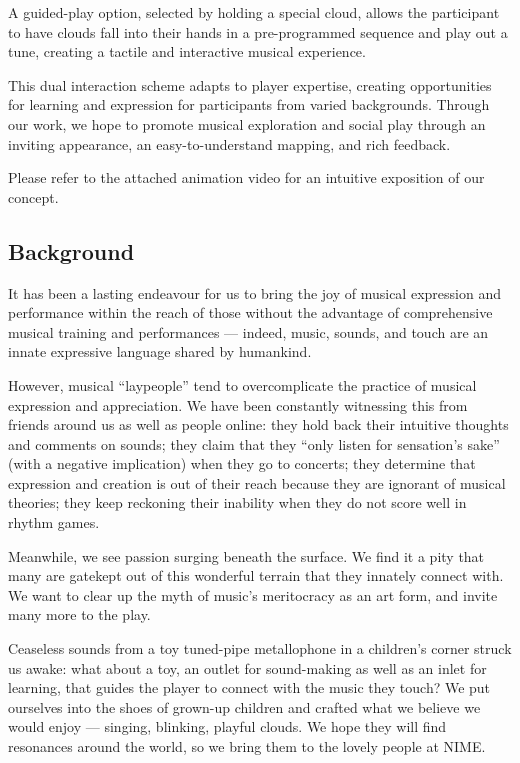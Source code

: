 \documentclass{nimemusic}
\begin{document}
A guided-play option, selected by holding a special cloud, allows the participant to have clouds fall into their hands in a pre-programmed sequence and play out a tune, creating a tactile and interactive musical experience.

This dual interaction scheme adapts to player expertise, creating opportunities for learning and expression for participants from varied backgrounds. Through our work, we hope to promote musical exploration and social play through an inviting appearance, an easy-to-understand mapping, and rich feedback.

Please refer to the attached animation video for an intuitive exposition of our concept.

\subsection{Background}
It has been a lasting endeavour for us to bring the joy of musical expression and performance within the reach of those without the advantage of comprehensive musical training and performances --- indeed, music, sounds, and touch are an innate expressive language shared by humankind.

However, musical ``laypeople'' tend to overcomplicate the practice of musical expression and appreciation. We have been constantly witnessing this from friends around us as well as people online: they hold back their intuitive thoughts and comments on sounds; they claim that they ``only listen for sensation's sake'' (with a negative implication) when they go to concerts; they determine that expression and creation is out of their reach because they are ignorant of musical theories; they keep reckoning their inability when they do not score well in rhythm games.

Meanwhile, we see passion surging beneath the surface. We find it a pity that many are gatekept out of this wonderful terrain that they innately connect with. We want to clear up the myth of music's meritocracy as an art form, and invite many more to the play.

Ceaseless sounds from a toy tuned-pipe metallophone in a children's corner struck us awake: what about a toy, an outlet for sound-making as well as an inlet for learning, that guides the player to connect with the music they touch? We put ourselves into the shoes of grown-up children and crafted what we believe we would enjoy --- singing, blinking, playful clouds. We hope they will find resonances around the world, so we bring them to the lovely people at NIME.
\end{document}
